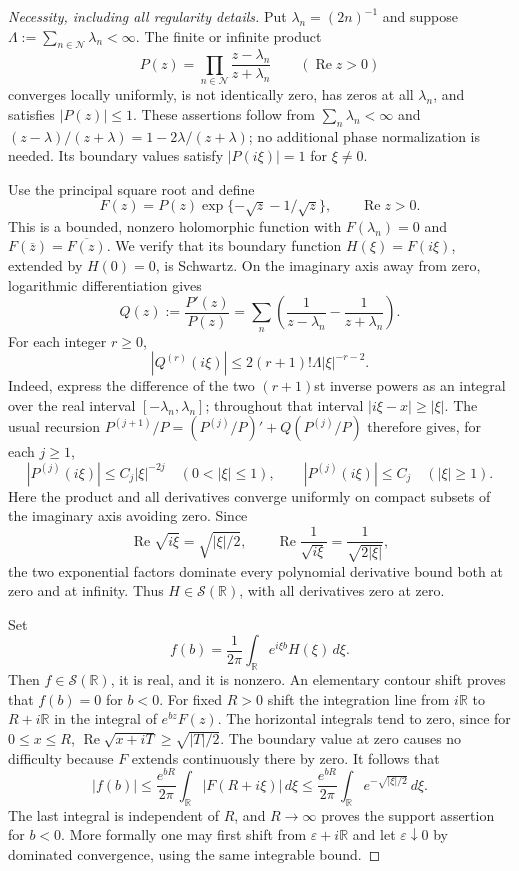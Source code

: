 \documentclass[11pt,letterpaper]{article}
\theoremstyle{definition}
\theoremstyle{remark}
\renewcommand{\Re}{\operatorname{Re}}
\newcommand{\1}{\mathbf 1}
\begin{document}
\begin{proof}[Necessity, including all regularity details]
Put $\lambda_n=(2n)^{-1}$ and suppose
$\Lambda:=\sum_{n\in\mathcal N}\lambda_n<\infty$.  The finite or
infinite product
\[
 P(z)=\prod_{n\in\mathcal N}\frac{z-\lambda_n}{z+\lambda_n}
       \qquad(\Re z>0)
\]
converges locally uniformly, is not identically zero, has zeros at all
$\lambda_n$, and satisfies $|P(z)|\le1$.  These assertions follow from
$\sum_n\lambda_n<\infty$ and
$(z-\lambda)/(z+\lambda)=1-2\lambda/(z+\lambda)$; no additional phase
normalization is needed.  Its boundary values satisfy $|P(i\xi)|=1$
for $\xi\ne0$.

Use the principal square root and define
\[
 F(z)=P(z)\exp\{-\sqrt z-1/\sqrt z\},\qquad \Re z>0.
\]
This is a bounded, nonzero holomorphic function with $F(\lambda_n)=0$
and $F(\overline z)=\overline{F(z)}$.  We verify that its boundary
function $H(\xi)=F(i\xi)$, extended by $H(0)=0$, is Schwartz.
On the imaginary axis away from zero, logarithmic differentiation gives
\[
 Q(z):=\frac{P'(z)}{P(z)}
 =\sum_n\left(\frac1{z-\lambda_n}-\frac1{z+\lambda_n}\right).
\]
For each integer $r\ge0$,
\[
 |Q^{(r)}(i\xi)|\le
       2(r+1)!\Lambda |\xi|^{-r-2}.
\]
Indeed, express the difference of the two $(r+1)$st inverse powers
as an integral over the real interval $[-\lambda_n,\lambda_n]$;
throughout that interval $|i\xi-x|\ge|\xi|$.  The usual recursion
$P^{(j+1)}/P=(P^{(j)}/P)'+Q(P^{(j)}/P)$ therefore gives, for each
$j\ge1$,
\[
 |P^{(j)}(i\xi)|\le C_j|\xi|^{-2j}\quad(0<|\xi|\le1),
 \qquad
 |P^{(j)}(i\xi)|\le C_j\quad(|\xi|\ge1).
\]
Here the product and all derivatives converge uniformly on compact
subsets of the imaginary axis avoiding zero.  Since
\[
 \Re\sqrt{i\xi}=\sqrt{|\xi|/2},\qquad
 \Re\frac1{\sqrt{i\xi}}=\frac1{\sqrt{2|\xi|}},
\]
the two exponential factors dominate every polynomial derivative
bound both at zero and at infinity.  Thus $H\in\mathcal S(\mathbb R)$,
with all derivatives zero at zero.

Set
\[
 f(b)=\frac1{2\pi}\int_{\mathbb R}e^{i\xi b}H(\xi)\,d\xi.
\]
Then $f\in\mathcal S(\mathbb R)$, it is real, and it is nonzero.
An elementary contour shift proves that $f(b)=0$ for $b<0$.
For fixed $R>0$ shift the integration line from $i\mathbb R$ to
$R+i\mathbb R$ in the integral of $e^{bz}F(z)$.  The horizontal
integrals tend to zero, since for $0\le x\le R$,
$\Re\sqrt{x+iT}\ge\sqrt{|T|/2}$.  The boundary value at zero causes
no difficulty because $F$ extends continuously there by zero.
It follows that
\[
 |f(b)|\le \frac{e^{bR}}{2\pi}
           \int_{\mathbb R}|F(R+i\xi)|\,d\xi
 \le \frac{e^{bR}}{2\pi}
           \int_{\mathbb R}e^{-\sqrt{|\xi|/2}}\,d\xi.
\]
The last integral is independent of $R$, and $R\to\infty$ proves the
support assertion for $b<0$.  More formally one may first shift from
$\varepsilon+i\mathbb R$ and let $\varepsilon\downarrow0$ by dominated
convergence, using the same integrable bound.


\end{proof}
\end{document}
